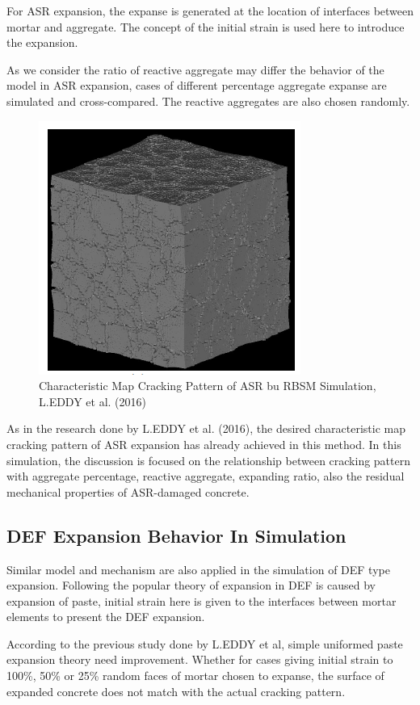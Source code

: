 For ASR expansion, the expanse is generated at the location of interfaces between mortar and aggregate. The concept of the initial strain is used here to introduce the expansion.

As we consider the ratio of reactive aggregate may differ the behavior of the model in ASR expansion,  cases of different percentage aggregate expanse are simulated and cross-compared. The reactive aggregates are also chosen randomly.

\begin{figure}
  \centering
  \includegraphics[width=0.4\linewidth]{Files/Background/EDDY_ASR.png}
  \caption{Characteristic Map Cracking Pattern of ASR bu RBSM Simulation, L.EDDY et al. (2016)}
\end{figure}

As in the research done by L.EDDY et al. (2016)\cite{Eddy}, the desired characteristic map cracking pattern of ASR expansion has already achieved in this method. In this simulation, the discussion is focused on the relationship between cracking pattern with aggregate percentage, reactive aggregate, expanding ratio, also the residual mechanical properties of ASR-damaged concrete.

\subsection{DEF Expansion Behavior In Simulation}

Similar model and mechanism are also applied in the simulation of DEF  type expansion. Following the popular theory of expansion in DEF  is caused by expansion of paste, initial strain here is given to the interfaces between mortar elements to present the DEF expansion.

According to the previous study done by L.EDDY et al, simple uniformed paste expansion theory need improvement. Whether for cases giving initial strain to 100\%, 50\% or 25\% random faces of mortar chosen to expanse, the surface of expanded concrete does not match with the actual cracking pattern.

